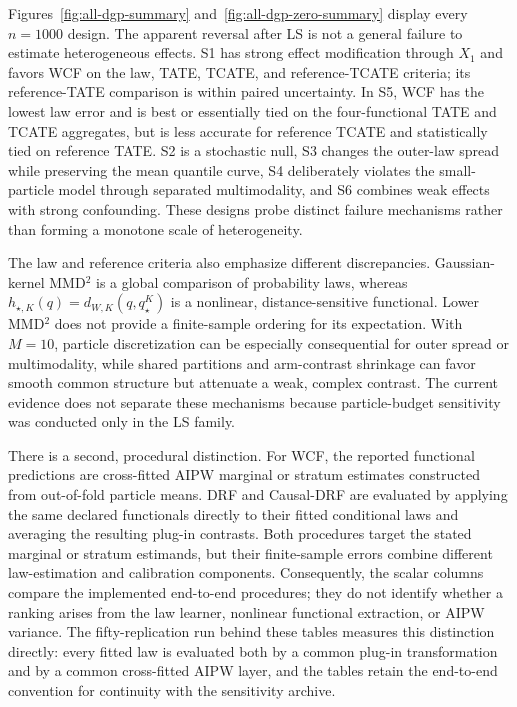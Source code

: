 Figures~\ref{fig:all-dgp-summary} and~\ref{fig:all-dgp-zero-summary} display every $n=1000$ design. The apparent reversal after LS is not a general failure to estimate heterogeneous effects. S1 has strong effect modification through $X_1$ and favors WCF on the law, TATE, TCATE, and reference-TCATE criteria; its reference-TATE comparison is within paired uncertainty. In S5, WCF has the lowest law error and is best or essentially tied on the four-functional TATE and TCATE aggregates, but is less accurate for reference TCATE and statistically tied on reference TATE. S2 is a stochastic null, S3 changes the outer-law spread while preserving the mean quantile curve, S4 deliberately violates the small-particle model through separated multimodality, and S6 combines weak effects with strong confounding. These designs probe distinct failure mechanisms rather than forming a monotone scale of heterogeneity.

The law and reference criteria also emphasize different discrepancies. Gaussian-kernel MMD$^2$ is a global comparison of probability laws, whereas $h_{\star,K}(q)=d_{W,K}(q,q_\star^K)$ is a nonlinear, distance-sensitive functional. Lower MMD$^2$ does not provide a finite-sample ordering for its expectation. With $M=10$, particle discretization can be especially consequential for outer spread or multimodality, while shared partitions and arm-contrast shrinkage can favor smooth common structure but attenuate a weak, complex contrast. The current evidence does not separate these mechanisms because particle-budget sensitivity was conducted only in the LS family.

There is a second, procedural distinction. For WCF, the reported functional predictions are cross-fitted AIPW marginal or stratum estimates constructed from out-of-fold particle means. DRF and Causal-DRF are evaluated by applying the same declared functionals directly to their fitted conditional laws and averaging the resulting plug-in contrasts. Both procedures target the stated marginal or stratum estimands, but their finite-sample errors combine different law-estimation and calibration components. Consequently, the scalar columns compare the implemented end-to-end procedures; they do not identify whether a ranking arises from the law learner, nonlinear functional extraction, or AIPW variance. The fifty-replication run behind these tables measures this distinction directly: every fitted law is evaluated both by a common plug-in transformation and by a common cross-fitted AIPW layer, and the tables retain the end-to-end convention for continuity with the sensitivity archive.

